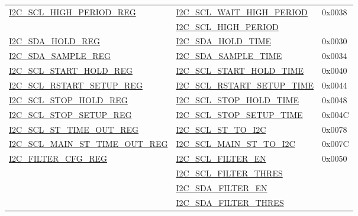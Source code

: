 \documentclass[main\_\_EN.tex]{subfiles}
\begin{document}
\begin{longtable}{ | p{6cm} | p{7cm} | p{2cm} | }
\hyperref[regdesc:I2CSCLHIGHPERIODREG]{I2C\_SCL\_HIGH\_PERIOD\_REG} & \hyperref[fielddesc:I2CSCLWAITHIGHPERIOD]{I2C\_SCL\_WAIT\_HIGH\_PERIOD} & 0x0038  \\\cline{2-2}
& \hyperref[fielddesc:I2CSCLHIGHPERIOD]{I2C\_SCL\_HIGH\_PERIOD}& \\ \hline

\hyperref[regdesc:I2CSDAHOLDREG]{I2C\_SDA\_HOLD\_REG} & \hyperref[fielddesc:I2CSDAHOLDTIME]{I2C\_SDA\_HOLD\_TIME} & 0x0030  \\\hline
\hyperref[regdesc:I2CSDASAMPLEREG]{I2C\_SDA\_SAMPLE\_REG} & \hyperref[fielddesc:I2CSDASAMPLETIME]{I2C\_SDA\_SAMPLE\_TIME} & 0x0034  \\ \hline

\hyperref[regdesc:I2CSCLSTARTHOLDREG]{I2C\_SCL\_START\_HOLD\_REG} & \hyperref[fielddesc:I2CSCLSTARTHOLDTIME]{I2C\_SCL\_START\_HOLD\_TIME} & 0x0040  \\ \hline
\hyperref[regdesc:I2CSCLRSTARTSETUPREG]{I2C\_SCL\_RSTART\_SETUP\_REG} & \hyperref[fielddesc:I2CSCLRSTARTSETUPTIME]{I2C\_SCL\_RSTART\_SETUP\_TIME} & 0x0044  \\ \hline

\hyperref[regdesc:I2CSCLSTOPHOLDREG]{I2C\_SCL\_STOP\_HOLD\_REG} & \hyperref[fielddesc:I2CSCLSTOPHOLDTIME]{I2C\_SCL\_STOP\_HOLD\_TIME} & 0x0048  \\ \hline
\hyperref[regdesc:I2CSCLSTOPSETUPREG]{I2C\_SCL\_STOP\_SETUP\_REG} & \hyperref[fielddesc:I2CSCLSTOPSETUPTIME]{I2C\_SCL\_STOP\_SETUP\_TIME} & 0x004C  \\ \hline

\hyperref[regdesc:I2CSCLSTTIMEOUTREG]{I2C\_SCL\_ST\_TIME\_OUT\_REG}& \hyperref[fielddesc:I2CSCLSTTOI2C]{I2C\_SCL\_ST\_TO\_I2C} & 0x0078\\ \hline
\hyperref[regdesc:I2CSCLMAINSTTIMEOUTREG]{I2C\_SCL\_MAIN\_ST\_TIME\_OUT\_REG}& \hyperref[fielddesc:I2CSCLMAINSTTOI2C]{I2C\_SCL\_MAIN\_ST\_TO\_I2C} & 0x007C\\ \hline


\hyperref[regdesc:I2CFILTERCFGREG]{I2C\_FILTER\_CFG\_REG} & {\hyperref[fielddesc:I2CSCLFILTEREN]{I2C\_SCL\_FILTER\_EN}} & 0x0050  \\\cline{2-2}
& {\hyperref[fielddesc:I2CSCLFILTERTHRES]{I2C\_SCL\_FILTER\_THRES}}& \\\cline{2-2}
& {\hyperref[fielddesc:I2CSDAFILTEREN]{I2C\_SDA\_FILTER\_EN}} &  \\\cline{2-2}
& {\hyperref[fielddesc:I2CSDAFILTERTHRES]{I2C\_SDA\_FILTER\_THRES}} & \\ \hline
\end{longtable}
\end{document}

